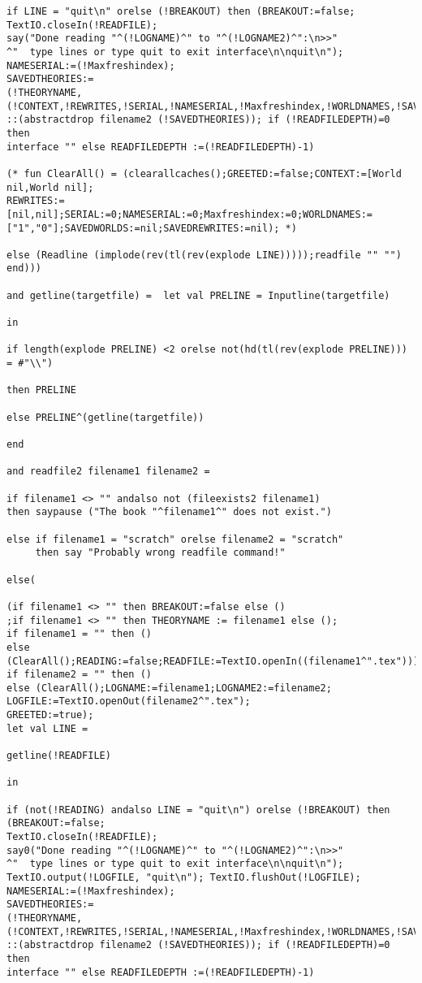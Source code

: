 \documentclass{article}
\begin{document}
\begin{verbatim}
if LINE = "quit\n" orelse (!BREAKOUT) then (BREAKOUT:=false;
TextIO.closeIn(!READFILE);
say("Done reading "^(!LOGNAME)^" to "^(!LOGNAME2)^":\n>>"
^"  type lines or type quit to exit interface\n\nquit\n"); 
NAMESERIAL:=(!Maxfreshindex);
SAVEDTHEORIES:= 
(!THEORYNAME,(!CONTEXT,!REWRITES,!SERIAL,!NAMESERIAL,!Maxfreshindex,!WORLDNAMES,!SAVEDWORLDS,!SAVEDREWRITES))
::(abstractdrop filename2 (!SAVEDTHEORIES)); if (!READFILEDEPTH)=0 then 
interface "" else READFILEDEPTH :=(!READFILEDEPTH)-1)

(* fun ClearAll() = (clearallcaches();GREETED:=false;CONTEXT:=[World nil,World nil];
REWRITES:=[nil,nil];SERIAL:=0;NAMESERIAL:=0;Maxfreshindex:=0;WORLDNAMES:=["1","0"];SAVEDWORLDS:=nil;SAVEDREWRITES:=nil); *)

else (Readline (implode(rev(tl(rev(explode LINE)))));readfile "" "") end)))

and getline(targetfile) =  let val PRELINE = Inputline(targetfile) 

in

if length(explode PRELINE) <2 orelse not(hd(tl(rev(explode PRELINE))) = #"\\")

then PRELINE

else PRELINE^(getline(targetfile))

end

and readfile2 filename1 filename2 =

if filename1 <> "" andalso not (fileexists2 filename1) 
then saypause ("The book "^filename1^" does not exist.")

else if filename1 = "scratch" orelse filename2 = "scratch" 
     then say "Probably wrong readfile command!"

else(

(if filename1 <> "" then BREAKOUT:=false else ()
;if filename1 <> "" then THEORYNAME := filename1 else (); 
if filename1 = "" then () 
else (ClearAll();READING:=false;READFILE:=TextIO.openIn((filename1^".tex"))); 
if filename2 = "" then () 
else (ClearAll();LOGNAME:=filename1;LOGNAME2:=filename2;
LOGFILE:=TextIO.openOut(filename2^".tex"); 
GREETED:=true);
let val LINE = 

getline(!READFILE)

in

if (not(!READING) andalso LINE = "quit\n") orelse (!BREAKOUT) then (BREAKOUT:=false;
TextIO.closeIn(!READFILE);
say0("Done reading "^(!LOGNAME)^" to "^(!LOGNAME2)^":\n>>"
^"  type lines or type quit to exit interface\n\nquit\n"); 
TextIO.output(!LOGFILE, "quit\n"); TextIO.flushOut(!LOGFILE);
NAMESERIAL:=(!Maxfreshindex);
SAVEDTHEORIES:= 
(!THEORYNAME,(!CONTEXT,!REWRITES,!SERIAL,!NAMESERIAL,!Maxfreshindex,!WORLDNAMES,!SAVEDWORLDS,!SAVEDREWRITES))
::(abstractdrop filename2 (!SAVEDTHEORIES)); if (!READFILEDEPTH)=0 then 
interface "" else READFILEDEPTH :=(!READFILEDEPTH)-1)


\end{verbatim}
\end{document}

